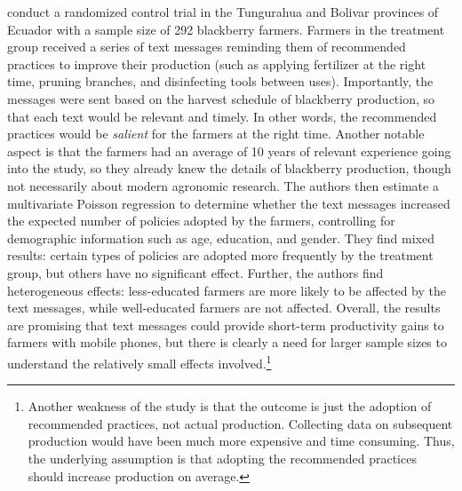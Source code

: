 \documentclass[12pt]{article}
\begin{document}
\textcite{carrion-yaguana_promoting_2020} conduct a randomized control trial in the Tungurahua and Bolivar provinces of Ecuador with a sample size of 292 blackberry farmers. Farmers in the treatment group received a series of text messages reminding them of recommended practices to improve their production (such as applying fertilizer at the right time, pruning branches, and disinfecting tools between uses). Importantly, the messages were sent based on the harvest schedule of blackberry production, so that each text would be relevant and timely. In other words, the recommended practices would be \textit{salient} for the farmers at the right time. Another notable aspect is that the farmers had an average of 10 years of relevant experience going into the study, so they already knew the details of blackberry production, though not necessarily about modern agronomic research. The authors then estimate a multivariate Poisson regression to determine whether the text messages increased the expected number of policies adopted by the farmers, controlling for demographic information such as age, education, and gender. They find mixed results: certain types of policies are adopted more frequently by the treatment group, but others have no significant effect. Further, the authors find heterogeneous effects: less-educated farmers are more likely to be affected by the text messages, while well-educated farmers are not affected. Overall, the results are promising that text messages could provide short-term productivity gains to farmers with mobile phones, but there is clearly a need for larger sample sizes to understand the relatively small effects involved.\footnote{Another weakness of the study is that the outcome is just the adoption of recommended practices, not actual production. Collecting data on subsequent production would have been much more expensive and time consuming. Thus, the underlying assumption is that adopting the recommended practices should increase production on average.}
\end{document}

